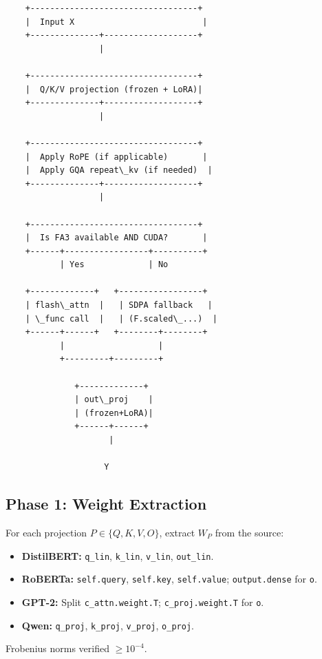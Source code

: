 \begin{lstlisting}
    +----------------------------------+
    |  Input X                          |
    +--------------+-------------------+
                   |
                    
    +----------------------------------+
    |  Q/K/V projection (frozen + LoRA)|
    +--------------+-------------------+
                   |
                    
    +----------------------------------+
    |  Apply RoPE (if applicable)       |
    |  Apply GQA repeat\_kv (if needed)  |
    +--------------+-------------------+
                   |
                    
    +----------------------------------+
    |  Is FA3 available AND CUDA?       |
    +------+-----------------+----------+
           | Yes             | No
                              
    +-------------+   +-----------------+
    | flash\_attn  |   | SDPA fallback   |
    | \_func call  |   | (F.scaled\_...)  |
    +------+------+   +--------+--------+
           |                   |
           +---------+---------+
                      
              +-------------+
              | out\_proj    |
              | (frozen+LoRA)|
              +------+------+
                     |
                      
                    Y
\end{lstlisting}

\subsection{Phase 1: Weight Extraction}

For each projection $P \in \{Q, K, V, O\}$, extract $W_P$ from the source:

\begin{itemize}
\item \textbf{DistilBERT:} \texttt{q\_lin}, \texttt{k\_lin}, \texttt{v\_lin}, \texttt{out\_lin}.
\item \textbf{RoBERTa:} \texttt{self.query}, \texttt{self.key}, \texttt{self.value}; \texttt{output.dense} for \texttt{o}.
\item \textbf{GPT-2:} Split \texttt{c\_attn.weight.T}; \texttt{c\_proj.weight.T} for \texttt{o}.
\item \textbf{Qwen:} \texttt{q\_proj}, \texttt{k\_proj}, \texttt{v\_proj}, \texttt{o\_proj}.

\end{itemize}
Frobenius norms verified $\geq 10^{-4}$.

